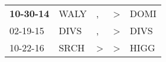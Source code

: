 \begin{supertabular}{p{0.07\textwidth}p{0.06\textwidth}p{0.02\textwidth}p{0.02\textwidth}p{0.06\textwidth}}
 \textbf{10-30-14\textsuperscript{}} &  WALY\textsuperscript{} &             , &  \textgreater &  DOMI\textsuperscript{} \\
          02-19-15\textsuperscript{} &  DIVS\textsuperscript{} &             , &  \textgreater &  DIVS\textsuperscript{} \\
          10-22-16\textsuperscript{} &  SRCH\textsuperscript{} &  \textgreater &  \textgreater &  HIGG\textsuperscript{} \\
\end{supertabular}
